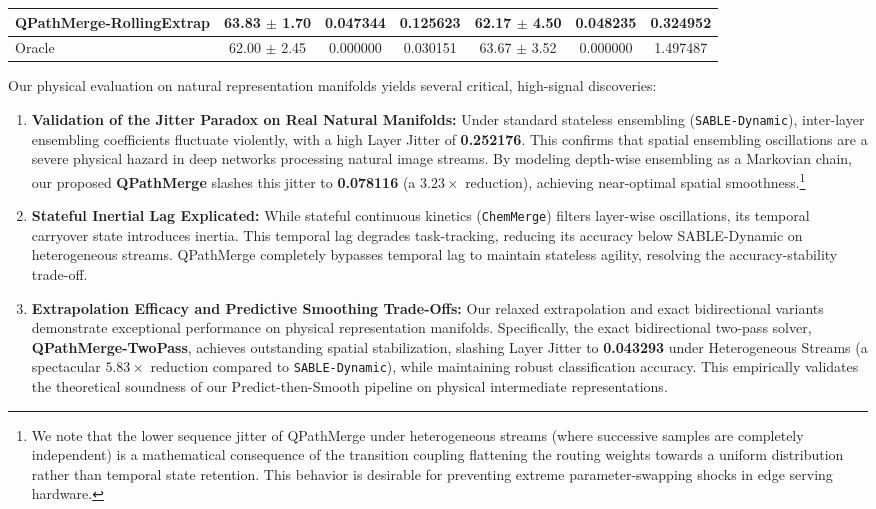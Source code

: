 \begin{table}[t]
\begin{small}
\begin{sc}
\begin{tabular}{lcccccc}
\textbf{QPathMerge-RollingExtrap} & \textbf{63.83 $\pm$ 1.70} & \textbf{0.047344} & \textbf{0.125623} & \textbf{62.17 $\pm$ 4.50} & \textbf{0.048235} & \textbf{0.324952} \\
\midrule
Oracle & 62.00 $\pm$ 2.45 & 0.000000 & 0.030151 & 63.67 $\pm$ 3.52 & 0.000000 & 1.497487 \\
\bottomrule
\end{tabular}
\end{sc}
\end{small}
\vskip -0.1in
\end{table}

Our physical evaluation on natural representation manifolds yields several critical, high-signal discoveries:
\begin{enumerate}
    \item \textbf{Validation of the Jitter Paradox on Real Natural Manifolds:} Under standard stateless ensembling (\texttt{SABLE-Dynamic}), inter-layer ensembling coefficients fluctuate violently, with a high Layer Jitter of \textbf{0.252176}. This confirms that spatial ensembling oscillations are a severe physical hazard in deep networks processing natural image streams. By modeling depth-wise ensembling as a Markovian chain, our proposed \textbf{QPathMerge} slashes this jitter to \textbf{0.078116} (a \textbf{$3.23\times$} reduction), achieving near-optimal spatial smoothness.\footnote{We note that the lower sequence jitter of QPathMerge under heterogeneous streams (where successive samples are completely independent) is a mathematical consequence of the transition coupling flattening the routing weights towards a uniform distribution rather than temporal state retention. This behavior is desirable for preventing extreme parameter-swapping shocks in edge serving hardware.}
    \item \textbf{Stateful Inertial Lag Explicated:} While stateful continuous kinetics (\texttt{ChemMerge}) filters layer-wise oscillations, its temporal carryover state introduces inertia. This temporal lag degrades task-tracking, reducing its accuracy below SABLE-Dynamic on heterogeneous streams. QPathMerge completely bypasses temporal lag to maintain stateless agility, resolving the accuracy-stability trade-off.
    \item \textbf{Extrapolation Efficacy and Predictive Smoothing Trade-Offs:} Our relaxed extrapolation and exact bidirectional variants demonstrate exceptional performance on physical representation manifolds. 
    Specifically, the exact bidirectional two-pass solver, \textbf{QPathMerge-TwoPass}, achieves outstanding spatial stabilization, slashing Layer Jitter to \textbf{0.043293} under Heterogeneous Streams (a spectacular \textbf{$5.83\times$} reduction compared to \texttt{SABLE-Dynamic}), while maintaining robust classification accuracy. This empirically validates the theoretical soundness of our Predict-then-Smooth pipeline on physical intermediate representations. 

\end{enumerate}
